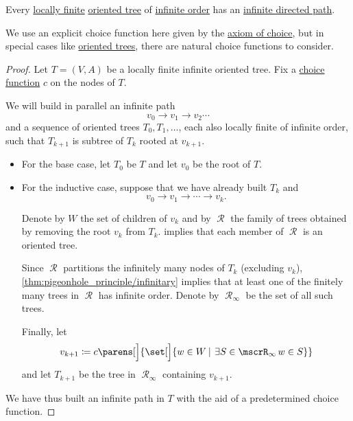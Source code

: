\begin{lemma}\label{thm:konigs_infinity_lemma_oriented}
  Every \hyperref[def:graph_cardinality/local]{locally finite} \hyperref[def:oriented_tree]{oriented tree} of \hyperref[def:graph_cardinality/order]{infinite order} has an \hyperref[def:graph_walk/path]{infinite directed path}.
\end{lemma}
\begin{comments}
  \item We use an explicit choice function here given by the \hyperref[def:zfc/choice]{axiom of choice}, but in special cases like \hyperref[def:oriented_tree]{oriented trees}, there are natural choice functions to consider.
\end{comments}
\begin{proof}
  Let \( T = (V, A) \) be a locally finite infinite oriented tree. Fix a \hyperref[def:choice_function]{choice function} \( c \) on the nodes of \( T \).

  We will build in parallel an infinite path
  \begin{equation*}
    v_0 \to v_1 \to v_2 \cdots
  \end{equation*}
  and a sequence of oriented trees \( T_0, T_1, \ldots \), each also locally finite of infinite order, such that \( T_{k+1} \) is subtree of \( T_k \) rooted at \( v_{k+1} \).

  \begin{itemize}
    \item For the base case, let \( T_0 \) be \( T \) and let \( v_0 \) be the root of \( T \).

    \item For the inductive case, suppose that we have already built \( T_k \) and
    \begin{equation*}
      v_0 \to v_1 \to \cdots \to v_k.
    \end{equation*}

    Denote by \( W \) the set of children of \( v_k \) and by \( \mscrR \) the family of trees obtained by removing the root \( v_k \) from \( T_k \).  implies that each member of \( \mscrR \) is an oriented tree.

    Since \( \mscrR \) partitions the infinitely many nodes of \( T_k \) (excluding \( v_k \)), \cref{thm:pigeonhole_principle/infinitary} implies that at least one of the finitely many trees in \( \mscrR \) has infinite order. Denote by \( \mscrR_\infty \) be the set of all such trees.

    Finally, let
    \begin{equation*}
      v_{k+1} \coloneqq c\parens[\Big]{ \set[\Big]{ w \in W \given \qexists* {S \in \mscrR_\infty} w \in S } }
    \end{equation*}
    and let \( T_{k+1} \) be the tree in \( \mscrR_\infty \) containing \( v_{k+1} \).
  \end{itemize}

  We have thus built an infinite path in \( T \) with the aid of a predetermined choice function.
\end{proof}

